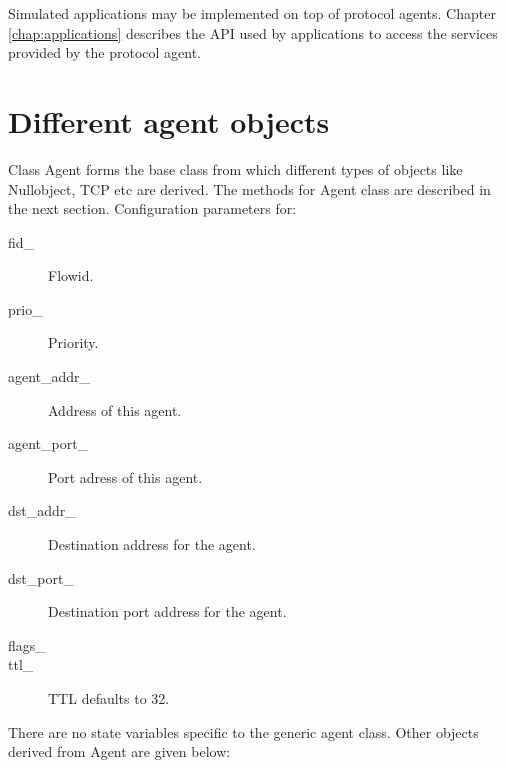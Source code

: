 Simulated applications may be implemented on top of protocol agents.  Chapter
\ref{chap:applications} describes the API used by applications to  access the 
services provided by the protocol agent.


\section{Different agent objects}
\label{sec:agentobjects}
Class Agent forms the base class from which different types of objects
like Nullobject, TCP etc are derived. The methods for Agent class are
described in the next section. Configuration parameters for:
\begin{description}
\item[fid\_] Flowid.
\item[prio\_] Priority. 
\item[agent\_addr\_] Address of this agent. 
\item[agent\_port\_] Port adress of this agent. 
\item[dst\_addr\_ ] Destination address for the agent.
\item[dst\_port\_] Destination port address for the agent.
\item[flags\_]
\item[ttl\_] TTL defaults to 32.
\end{description}
There are no state variables specific to the generic agent class. Other
objects derived from Agent are given below:

